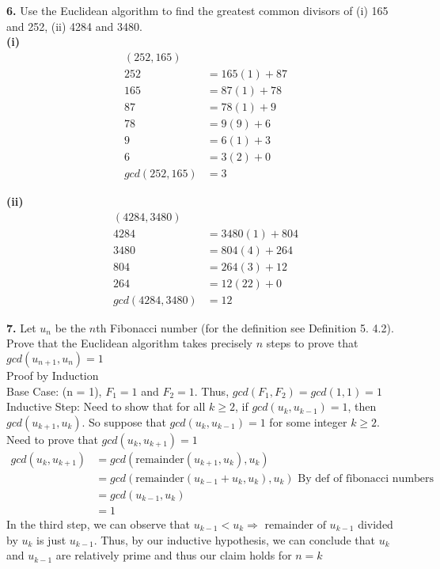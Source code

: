\documentclass[paper=letter, fontsize=11pt]{scrartcl} %
\begin{document}
\textbf{6.} Use the Euclidean algorithm to find the greatest common divisors of (i) 165 
and 252, (ii) 4284 and 3480. \\ 

\textbf{(i)} 
\begin{align*}
    (252,165) &\\
    252 &= 165(1) + 87 \\
    165 &= 87(1) + 78 \\
    87 &= 78(1) + 9 \\
    78 &= 9(9) + 6 \\
    9 &= 6(1) + 3 \\
    6 &= 3(2) + 0 \\
    gcd(252,165) &= 3
\end{align*}

\textbf{(ii)}
\begin{align*}
    (4284,3480) & \\
    4284 &= 3480(1) + 804 \\
    3480 &= 804(4) + 264 \\
    804 &= 264(3) + 12 \\
    264 &= 12(22) + 0 \\
    gcd(4284,3480) &= 12
\end{align*}

\textbf{7.} Let $u_n$ be the $n$th Fibonacci number (for the definition see Definition 5.
4.2). Prove that the Euclidean algorithm takes precisely $n$ steps to prove that $gcd(u_{n
+1},u_n) = 1$ \\

Proof by Induction \\
Base Case: (n = 1), $F_1 = 1$ and $F_2 = 1$. Thus, $gcd(F_1,F_2) = gcd(1,1) = 1$ \\

Inductive Step: Need to show that for all $k \ge 2$, if $gcd(u_k,u_{k-1}) = 1$, then 
$gcd(u_{k+1},u_k)$. So suppose that $gcd(u_k,u_{k-1}) = 1$ for some integer $k \ge 2$.
Need to prove that $gcd(u_{k},u_{k+1}) = 1$ \\
\begin{align*}
    gcd(u_k,u_{k+1}) &= gcd(\text{remainder}(u_{k+1},u_k),u_k) \\ 
    &= gcd(\text{remainder}(u_{k-1} + u_k, u_k),u_k) \text{ By def of fibonacci numbers} \\
    &= gcd(u_{k-1},u_k) \\
    &= 1
\end{align*}
In the third step, we can observe that $u_{k-1} < u_k \Rightarrow \text{ remainder of } 
u_{k-1}$ divided by $u_k$ is just $u_{k-1}$. Thus, by our inductive hypothesis, we can 
conclude that $u_k$ and $u_{k-1}$ are relatively prime and thus our claim holds for $n=k$
\\
\end{document}
